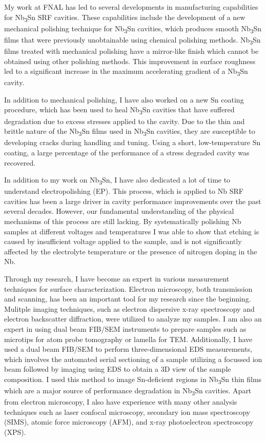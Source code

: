 \documentclass[]{revtex4-2}
\begin{document}
    My work at FNAL has led to several developments in manufacturing capabilities for Nb\textsubscript{3}Sn SRF cavities. These capabilities include the development of a new mechanical polishing technique for Nb\textsubscript{3}Sn cavities, which produces smooth Nb\textsubscript{3}Sn films that were previously unobtainable using chemical polishing methods.\cite{viklund2024improving} Nb\textsubscript{3}Sn films treated with mechanical polishing have a mirror-like finish which cannot be obtained using other polishing methods. This improvement in surface roughness led to a significant increase in the maximum accelerating gradient of a Nb\textsubscript{3}Sn cavity.
    
    In addition to mechanical polishing, I have also worked on a new Sn coating procedure, which has been used to heal Nb\textsubscript{3}Sn cavities that have suffered degradation due to excess stresses applied to the cavity. Due to the thin and brittle nature of the Nb\textsubscript{3}Sn films used in Nb\textsubscript{3}Sn cavities, they are susceptible to developing cracks during handling and tuning. Using a short, low-temperature Sn coating, a large percentage of the performance of a stress degraded cavity was recovered.

    In addition to my work on Nb\textsubscript{3}Sn, I have also dedicated a lot of time to understand electropolishing (EP). This process, which is applied to Nb SRF cavities has been a large driver in cavity performance improvements over the past several decades. However, our fundamental understanding of the physical mechanisms of this process are still lacking. By systematically polishing Nb samples at different voltages and temperatures I was able to show that etching is caused by insufficient voltage applied to the sample, and is not significantly affected by the electrolyte temperature or the presence of nitrogen doping in the Nb.\cite{viklund:srf2021-supcav016}

    Through my research, I have become an expert in various measurement techniques for surface characterization. Electron microscopy, both transmission and scanning, has been an important tool for my research since the beginning. Mulitple imaging techniques, such as electron dispersive x-ray spectroscopy and electron backscatter diffraction, were utilized to analyze my samples. I am also an expert in using dual beam FIB/SEM instruments to prepare samples such as microtips for atom probe tomography or lamella for TEM. Additionally, I have used a dual beam FIB/SEM to perform three-dimensional EDS measurements, which involves the automated serial sectioning of a sample utilizing a focussed ion beam followed by imaging using EDS to obtain a 3D view of the sample composition. I used this method to image Sn-deficient regions in Nb\textsubscript{3}Sn thin films which are a major source of performance degradation in Nb\textsubscript{3}Sn cavities. \cite{viklund2023three} Apart from electron microscopy, I also have experience with many other analysis techniques such as laser confocal microscopy, secondary ion mass spectroscopy (SIMS), atomic force microscopy (AFM), and x-ray photoelectron spectroscopy (XPS).
\end{document}
